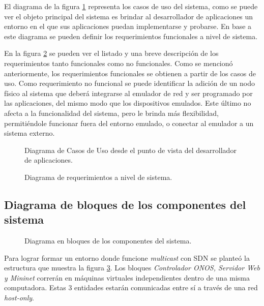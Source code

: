 El diagrama de la figura \ref{fig:usecase} representa los casos de uso del sistema, como se puede ver el objeto principal del sistema es brindar al desarrollador de aplicaciones un entorno en el que sus aplicaciones puedan implementarse y probarse. En base a este diagrama se pueden definir los requerimientos funcionales a nivel de sistema. 

En la figura \ref{fig:sistreqs} se pueden ver el listado y una breve descripción de los requerimientos tanto funcionales como no funcionales. Como se mencionó anteriormente, los requerimientos funcionales se obtienen a partir de los casos de uso. Como requerimiento no funcional se puede identificar la adición de un nodo físico al sistema que deberá integrarse al emulador de red y ser programado por las aplicaciones, del mismo modo que los dispositivos emulados. Este último no afecta a la funcionalidad del sistema, pero le brinda más flexibilidad, permitiéndole funcionar fuera del entorno emulado, o conectar al emulador a un sistema externo.


\begin{figure}[th]
    \centering 
    \caption[Diagrama de Casos de Uso SysML]{Diagrama de Casos de Uso desde el punto de vista del desarrollador de aplicaciones.}
    \label{fig:usecase}
\end{figure}

\begin{figure}[th]
    \centering 
    \caption[Diagrama de Requerimientos SysML]{Diagrama de requerimientos a nivel de sistema.}
    \label{fig:sistreqs}
\end{figure}


\subsection{Diagrama de bloques de los componentes del sistema}
\begin{figure}[th]
	\centering 
	\caption[Diagrama en bloques SysML]{Diagrama en bloques de los componentes del sistema.}
	\label{fig:BlockDiagram}
\end{figure}

Para lograr formar un entorno donde funcione \textit{multicast} con SDN se planteó la estructura que muestra la figura 
\ref{fig:BlockDiagram}. Los bloques \textit{Controlador ONOS, Servidor Web y Mininet} correrán en máquinas virtuales 
independientes dentro de una misma computadora. Estas 3 entidades estarán comunicadas entre sí a través de una red 
\textit{host-only}. 

